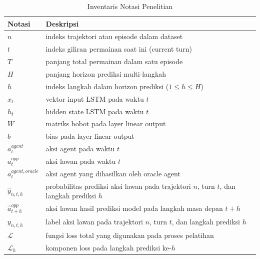 \begin{table}[h]
\centering
\caption{Inventaris Notasi Penelitian}
\begin{tabular}{ll}
\hline
\textbf{Notasi} & \textbf{Deskripsi} \\
\hline

$n$ & indeks trajektori atau episode dalam dataset \\

$t$ & indeks giliran permainan saat ini (current turn) \\

$T$ & panjang total permainan dalam satu episode \\

$H$ & panjang horizon prediksi multi-langkah \\

$h$ & indeks langkah dalam horizon prediksi ($1 \le h \le H$) \\

$x_t$ & vektor input LSTM pada waktu $t$ \\

$h_t$ & hidden state LSTM pada waktu $t$ \\

$W$ & matriks bobot pada layer linear output \\

$b$ & bias pada layer linear output \\

$a_t^{agent}$ & aksi agent pada waktu $t$ \\

$a_t^{opp}$ & aksi lawan pada waktu $t$ \\

$a_t^{agent,oracle}$ & aksi agent yang dihasilkan oleh oracle agent \\

$\hat{y}_{n,t,h}$ & probabilitas prediksi aksi lawan pada trajektori $n$, turn $t$, dan langkah prediksi $h$ \\

$\hat{a}_{t+h}^{opp}$ & aksi lawan hasil prediksi model pada langkah masa depan $t+h$ \\

$y_{n,t,h}$ & label aksi lawan pada trajektori $n$, turn $t$, dan langkah prediksi $h$ \\

$\mathcal{L}$ & fungsi loss total yang digunakan pada proses pelatihan \\

$\mathcal{L}_h$ & komponen loss pada langkah prediksi ke-$h$ \\


\end{tabular}
\end{table}
